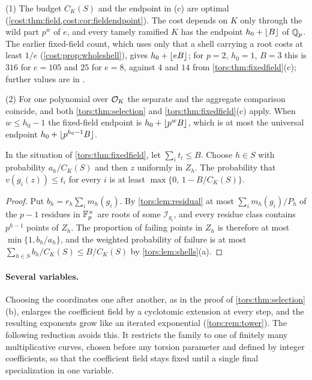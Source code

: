 \begin{remark}\label{tors:rem:fixedfield}
(1) The budget $C_K(S)$ and the endpoint in \textup{(c)} are optimal
(\cref{cost:thm:field,cost:cor:fieldendpoint}). The cost depends on $K$ only through the
wild part $p^w$ of $e$, and every tamely ramified $K$ has the endpoint $h_0+\lfloor B\rfloor$ of
$\mathbb{Q}_p$. The earlier fixed-field count, which uses only that a shell carrying a root costs
at least $1/e$ (\cref{cost:prop:wholeshell}), gives $h_0+\lfloor eB\rfloor$; for $p=2$, $h_0=1$,
$B=3$ this is $316$ for $e=105$ and $25$ for $e=8$, against $4$ and $14$ from
\cref{tors:thm:fixedfield}(c); further values are in
.

(2) For one polynomial over $\mathcal{O}_K$ the separate and the aggregate comparison coincide,
and both \cref{tors:thm:selection} and \cref{tors:thm:fixedfield}(c) apply. When
$w\le h_0-1$ the fixed-field endpoint is $h_0+\lfloor p^wB\rfloor$, which is at most the
universal endpoint $h_0+\lfloor p^{h_0-1}B\rfloor$.
\end{remark}

\begin{corollary}\label{tors:cor:sampling}
In the situation of \cref{tors:thm:fixedfield}, let $\sum_it_i\le B$. Choose $h\in S$
with probability $a_h/C_K(S)$ and then $z$ uniformly in $Z_h$. The probability that
$v(g_i(z))\le t_i$ for every $i$ is at least $\max\{0,\,1-B/C_K(S)\}$.
\end{corollary}

\begin{proof}
Put $b_h=r_h\sum_im_h(g_i)$. By \cref{tors:lem:residual} at most $\sum_im_h(g_i)/P_h$ of
the $p-1$ residues in $\mathbb{F}_p^\times$ are roots of some $\mathcal I_{g_i}$, and every
residue class contains $p^{h-1}$ points of $Z_h$. The proportion of failing points in
$Z_h$ is therefore at most $\min\{1,b_h/a_h\}$, and the weighted probability of failure is
at most $\sum_{h\in S}b_h/C_K(S)\le B/C_K(S)$ by \cref{tors:lem:shells}(a).
\end{proof}

\paragraph{Several variables.}
Choosing the coordinates one after another, as in the proof of
\cref{tors:thm:selection}(b), enlarges the coefficient field by a cyclotomic extension at
every step, and the resulting exponents grow like an iterated exponential
(\cref{tors:rem:tower}). The following reduction avoids this. It restricts the family to
one of finitely many multiplicative curves, chosen before any torsion parameter and
defined by integer coefficients, so that the coefficient field stays fixed until a single
final specialization in one variable.

